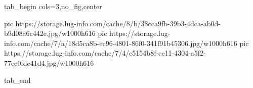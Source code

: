  
 
 
 
 


\ifcmt
  tab_begin cols=3,no_fig,center

     pic https://storage.lug-info.com/cache/8/b/38cca9fb-39b3-4dca-ab0d-b9d08a6c442e.jpg/w1000h616%
     pic https://storage.lug-info.com/cache/7/a/18d5ca8b-ec96-4801-86f0-341f91b45306.jpg/w1000h616%
     pic https://storage.lug-info.com/cache/7/4/c5154b8f-ce11-4304-a5f2-77ce0fdc41d4.jpg/w1000h616%

  tab_end
\fi
